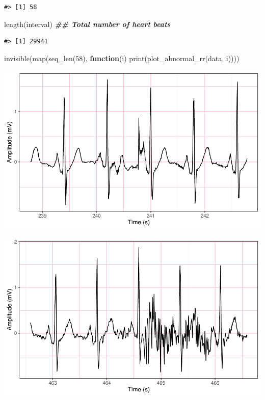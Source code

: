 \documentclass[
]{article}
\newenvironment{Shaded}{\begin{snugshade}}{\end{snugshade}}
\newcommand{\ControlFlowTok}[1]{\textcolor[rgb]{0.13,0.29,0.53}{\textbf{#1}}}
\newcommand{\DecValTok}[1]{\textcolor[rgb]{0.00,0.00,0.81}{#1}}
\newcommand{\DocumentationTok}[1]{\textcolor[rgb]{0.56,0.35,0.01}{\textbf{\textit{#1}}}}
\newcommand{\FunctionTok}[1]{\textcolor[rgb]{0.00,0.00,0.00}{#1}}
\newcommand{\NormalTok}[1]{#1}
\begin{document}
\begin{verbatim}
#> [1] 58
\end{verbatim}

\begin{Shaded}
\begin{Highlighting}[]
\FunctionTok{length}\NormalTok{(interval) }\DocumentationTok{\#\# Total number of heart beats}
\end{Highlighting}
\end{Shaded}

\begin{verbatim}
#> [1] 29941
\end{verbatim}

\begin{Shaded}
\begin{Highlighting}[]
\FunctionTok{invisible}\NormalTok{(}\FunctionTok{map}\NormalTok{(}\FunctionTok{seq\_len}\NormalTok{(}\DecValTok{58}\NormalTok{), }\ControlFlowTok{function}\NormalTok{(i) }\FunctionTok{print}\NormalTok{(}\FunctionTok{plot\_abnormal\_rr}\NormalTok{(data, i))))}
\end{Highlighting}
\end{Shaded}

\begin{center}\includegraphics{report_files/figure-latex/abnormal-interval-1} \end{center}

\begin{center}\includegraphics{report_files/figure-latex/abnormal-interval-2} \end{center}
\end{document}
